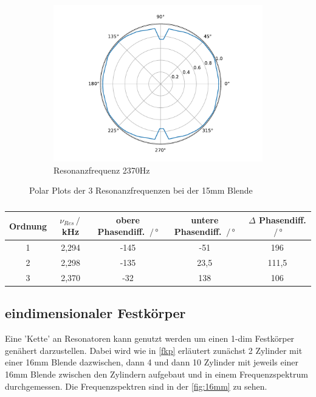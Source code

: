 \begin{figure}
\begin{subfigure}[b]{0.3\textwidth}
        \includegraphics[width=\textwidth]{pic/polar_max_369.pdf}
        \caption{Resonanzfrequenz 2370Hz}
    \end{subfigure}
    \caption{Polar Plots der 3 Resonanzfrequenzen bei der 15mm Blende}
\end{figure}

\begin{table}
    \caption{}
    \center
    \begin{tabular}{c| c c c c}
        \toprule
        Ordnung & $\nu_{Res}\,/\,$kHz & obere Phasendiff. $\,/\,°$ & untere Phasendiff. $\,/\,°$ & $\Delta$ Phasendiff. $\,/\,°$\\
        \midrule
        1 &2,294 &-145 &-51 &196 \\
        2 &2,298 &-135 &23,5 & 111,5\\
        3 &2,370 &-32 &138 & 106\\
        \bottomrule
    \end{tabular}
    \label{tab:phasen}
\end{table}


\subsection{eindimensionaler Festkörper}
Eine 'Kette' an Resonatoren kann genutzt werden um einen 1-dim Festkörper genähert darzustellen. Dabei wird wie in \autoref{fkp} erläutert zunächst 2 Zylinder
mit einer 16mm Blende dazwischen, dann 4 und dann 10 Zylinder mit jeweils einer 16mm Blende zwischen den Zylindern aufgebaut und in einem Frequenzspektrum durchgemessen.
Die Frequenzspektren sind in der \autoref{fig:16mm} zu sehen.

